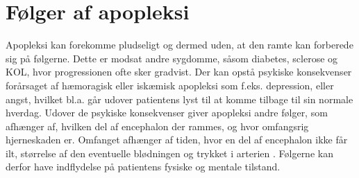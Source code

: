 \section{Følger af apopleksi }
Apopleksi kan forekomme pludseligt og dermed uden, at den ramte kan forberede sig på følgerne. Dette er modsat andre sygdomme, såsom diabetes, sclerose og KOL, hvor progressionen ofte sker gradvist. Der kan opstå psykiske konsekvenser forårsaget af hæmoragisk eller iskæmisk apopleksi som f.eks. depression, eller angst, hvilket bl.a. går udover patientens lyst til at komme tilbage til sin normale hverdag. \cite{Muus2008} Udover de psykiske konsekvenser giver apopleksi andre følger, som afhænger af, hvilken del af encephalon der rammes, og hvor omfangsrig hjerneskaden er. Omfanget afhænger af tiden, hvor en del af encephalon ikke får ilt, størrelse af den eventuelle blødningen og trykket i arterien \cite{Michael-Titus2010}. Følgerne kan derfor have indflydelse på patientens fysiske og mentale tilstand. \\



